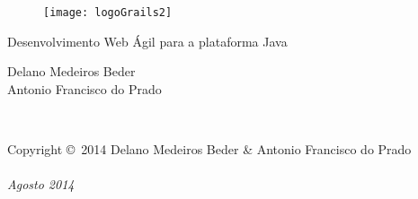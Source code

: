 \documentclass[11pt,fleqn]{book}
\begin{document}
\sloppy

\setcounter{page}{1}



\begingroup
\thispagestyle{empty}
\centering
\vspace*{5cm}
\par\normalfont\fontsize{32}{32}\sffamily\selectfont
\begin{figure}[h]
\centering\texttt{[image: logoGrails2]}
\end{figure}
\vspace{3cm}
Desenvolvimento Web Ágil para a plataforma Java\par %
\vspace*{4cm}
{\Huge 
Delano Medeiros Beder \\
Antonio Francisco do Prado
}\par %

\endgroup


\newpage
~\vfill
\thispagestyle{empty}

\noindent Copyright \copyright\ 2014 Delano Medeiros Beder \& Antonio Francisco do Prado\\ %


\hspace{1cm}\\
\noindent \textit{Agosto 2014} %



\pagestyle{empty} %
\end{document}
